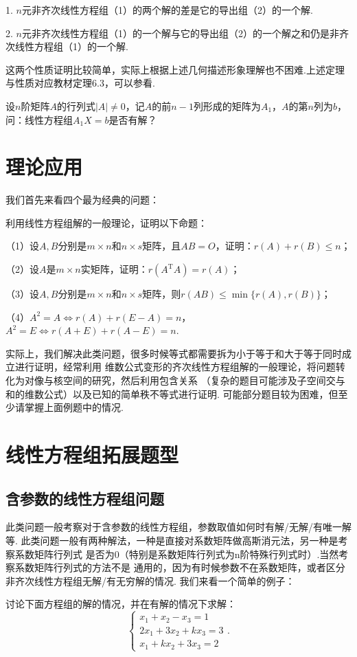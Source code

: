 1. $n$元非齐次线性方程组（1）的两个解的差是它的导出组（2）的一个解.

2. $n$元非齐次线性方程组（1）的一个解与它的导出组（2）的一个解之和仍是非齐次线性方程组（1）的一个解.

这两个性质证明比较简单，实际上根据上述几何描述形象理解也不困难.上述定理与性质对应教材定理6.3，可以参看.
\begin{example}
	设$n$阶矩阵$A$的行列式$|A|\neq 0$，记$A$的前$n-1$列形成的矩阵为$A_1$，$A$的第$n$列为$b$，
	问：线性方程组$A_1X=b$是否有解？
\end{example}

\section{理论应用}
我们首先来看四个最为经典的问题：
\begin{example}
	利用线性方程组解的一般理论，证明以下命题：
	
	\textup{（1）}设$A,B$分别是$m \times n$和$n \times s$矩阵，且$AB=O$，证明：$r(A)+r(B)\le n$\textup{；}

	\textup{（2）}设$A$是$m \times n$实矩阵，证明：$r(A^\mathrm{T}A)=r(A)$\textup{；}

	\textup{（3）}设$A,B$分别是$m \times n$和$n \times s$矩阵，则$r(AB)\le\min\{r(A),r(B)\}$\textup{；}

	\textup{（4）}$A^2=A \iff r(A)+r(E-A)=n$，$A^2=E \iff r(A+E)+r(A-E)=n$.
\end{example}
实际上，我们解决此类问题，很多时候等式都需要拆为小于等于和大于等于同时成立进行证明，经常利用
维数公式变形的齐次线性方程组解的一般理论，将问题转化为对像与核空间的研究，然后利用包含关系
（复杂的题目可能涉及子空间交与和的维数公式）以及已知的简单秩不等式进行证明.
可能部分题目较为困难，但至少请掌握上面例题中的情况.

\section{线性方程组拓展题型}
\subsection{含参数的线性方程组问题}
此类问题一般考察对于含参数的线性方程组，参数取值如何时有解/无解/有唯一解等.
此类问题一般有两种解法，一种是直接对系数矩阵做高斯消元法，另一种是考察系数矩阵行列式
是否为0（特别是系数矩阵行列式为n阶特殊行列式时）.当然考察系数矩阵行列式的方法不是
通用的，因为有时候参数不在系数矩阵，或者区分非齐次线性方程组无解/有无穷解的情况.
我们来看一个简单的例子：
\begin{example}
	讨论下面方程组的解的情况，并在有解的情况下求解：$$\begin{cases}
		x_1+x_2-x_3=1 \\ 2x_1+3x_2+kx_3=3 \\ x_1+kx_2+3x_3=2
	\end{cases}.$$
\end{example}
